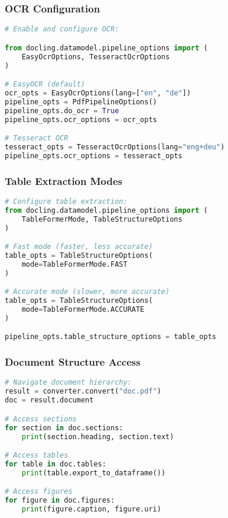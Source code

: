 \begin{frame}[fragile]\frametitle{OCR Configuration}
\begin{lstlisting}[language=python,basicstyle=\tiny]
# Enable and configure OCR:

from docling.datamodel.pipeline_options import (
    EasyOcrOptions, TesseractOcrOptions
)

# EasyOCR (default)
ocr_opts = EasyOcrOptions(lang=["en", "de"])
pipeline_opts = PdfPipelineOptions()
pipeline_opts.do_ocr = True
pipeline_opts.ocr_options = ocr_opts

# Tesseract OCR
tesseract_opts = TesseractOcrOptions(lang="eng+deu")
pipeline_opts.ocr_options = tesseract_opts
\end{lstlisting}
\end{frame}

\begin{frame}[fragile]\frametitle{Table Extraction Modes}
\begin{lstlisting}[language=python,basicstyle=\tiny]
# Configure table extraction:
from docling.datamodel.pipeline_options import (
    TableFormerMode, TableStructureOptions
)

# Fast mode (faster, less accurate)
table_opts = TableStructureOptions(
    mode=TableFormerMode.FAST
)

# Accurate mode (slower, more accurate)
table_opts = TableStructureOptions(
    mode=TableFormerMode.ACCURATE
)

pipeline_opts.table_structure_options = table_opts
\end{lstlisting}
\end{frame}

\begin{frame}[fragile]\frametitle{Document Structure Access}
\begin{lstlisting}[language=python,basicstyle=\tiny]
# Navigate document hierarchy:
result = converter.convert("doc.pdf")
doc = result.document

# Access sections
for section in doc.sections:
    print(section.heading, section.text)

# Access tables
for table in doc.tables:
    print(table.export_to_dataframe())

# Access figures
for figure in doc.figures:
    print(figure.caption, figure.uri)
\end{lstlisting}
\end{frame}

